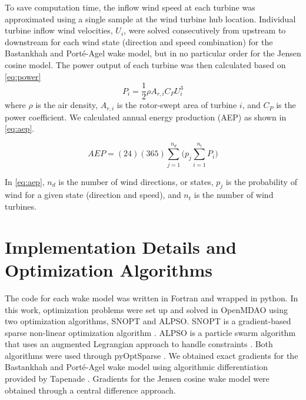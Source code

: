 \documentclass[a4paper]{jpconf}
\begin{document}
To save computation time, the inflow wind speed at each turbine was approximated using a single sample at the wind turbine hub location. Individual turbine inflow wind velocities, $U_i$, were solved consecutively from upstream to downstream for each wind state (direction and speed combination) for the Bastankhah and Port\'e-Agel wake model, but in no particular order for the Jensen cosine model. The power output of each turbine was then calculated based on \cref{eq:power}
%
\begin{equation}\label{eq:power}
P_i = \frac{1}{2}\rho A_{r,i}C_P U_i^3
\end{equation}
%
where $\rho$ is the air density, $A_{r,i}$ is the rotor-swept area of turbine $i$, and $C_P$ is the power coefficient. We calculated annual energy production (AEP) as shown in \cref{eq:aep}.

\begin{equation} \label{eq:aep}
AEP = (24)(365)\sum_{j=1}^{n_d} \bigg( p_j \sum_{i=1}^{n_t} P_i \bigg)  
\end{equation}

 In \cref{eq:aep}, $n_d$ is the number of wind directions, or states, $p_j$ is the probability of wind for a given state (direction and speed), and $n_t$ is the number of wind turbines.

\section{Implementation Details and Optimization Algorithms}
The code for each wake model was written in Fortran and wrapped in python. In this work, optimization problems were set up and solved in OpenMDAO \cite{gray2010_OpenMDAO} using two optimization algorithms, SNOPT and ALPSO. SNOPT is a gradient-based sparse non-linear optimization algorithm \cite{gill2005}. ALPSO is a particle swarm algorithm that uses an augmented Legrangian approach to handle constraints \cite{jansen2011_alpso}. Both algorithms were used through pyOptSparse \cite{perez2012a}. We obtained exact gradients for the Bastankhah and Port\'e-Agel wake model using algorithmic differentiation provided by Tapenade \cite{tapenade2013}. Gradients for the Jensen cosine wake model were obtained through a central difference approach. 
\end{document}
